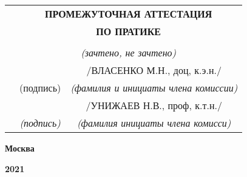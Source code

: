\begin{titlepage}
    \begin{center}
    \setlength\extrarowheight{-3pt}
    \begin{tabularx}{\textwidth}{p{} c c}
        & \multicolumn{2}{c}{\textbf{ПРОМЕЖУТОЧНАЯ АТТЕСТАЦИЯ}} \\ 
        & \multicolumn{2}{c}{\textbf{ПО ПРАТИКЕ}} \\ & & \\ \cline{2-3}
        & \multicolumn{2}{c}{\small \textit{(зачтено, не зачтено)}} \\ 
        & & /ВЛАСЕНКО М.Н., доц, к.э.н./ \\ \cline{2-3}
        & \small (подпись) & \small \textit{(фамилия и инициаты члена комиссии)} \\
        & & /УНИЖАЕВ Н.В., проф, к.т.н./ \\ \cline{2-3}
        & \small \textit{(подпись)} & \small \textit{(фамилия инициаты члена комисси)}
    \end{tabularx}
    
    \vspace{1cm}
    
    \textbf{Москва}
    
    \textbf{2021}
    \end{center}
    
\end{titlepage}